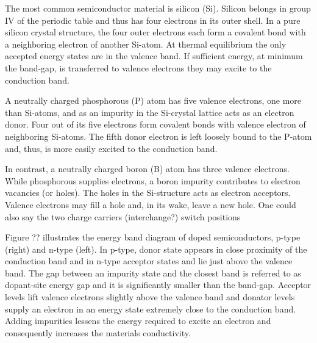 The most common semiconductor material is silicon (Si). Silicon belongs in group IV of the periodic table and thus has four electrons in its outer shell. In a pure silicon crystal structure, the four outer electrons each form a covalent bond with a neighboring electron of another Si-atom. At thermal equilibrium the only accepted energy states are in the valence band. If sufficient energy, at minimum the band-gap, is transferred to valence electrons they may excite to the conduction band.

A neutrally charged phosphorous (P) atom has five valence electrons, one more than Si-atoms, and as an impurity in the Si-crystal lattice acts as an electron donor. Four out of its five electrons form covalent bonds with valence electron of neighboring Si-atoms. The fifth donor electron is left loosely bound to the P-atom and, thus, is more easily excited to the conduction band.

In contrast, a neutrally charged boron (B) atom has three valence electrons. While phosphorous supplies electrons, a boron impurity contributes to electron vacancies (or holes). The holes in the Si-structure acts as electron acceptors. Valence electrons may fill a hole and, in its wake, leave a new hole. One could also say the two charge carriers (interchange?) switch positions

Figure ?? illustrates the energy band diagram of doped semiconductors, p-type (right) and n-type (left).
In p-type, donor state appears in close proximity of the conduction band and in n-type acceptor states and lie just above the valence band. The gap between an impurity state and the closest band is referred to as dopant-site energy gap and it is significantly smaller than the band-gap. Acceptor levels lift valence electrons slightly above the valence band and donator levels supply an electron in an energy state extremely close to the conduction band. Adding impurities lessens the energy required to excite an electron and consequently increases the materials conductivity.


